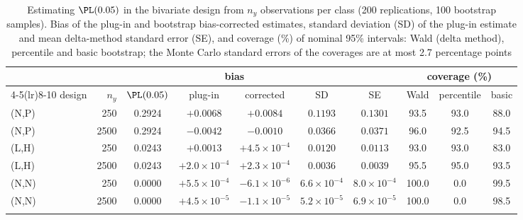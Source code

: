 \begin{table}[t]
\caption{Estimating $\PL(0.05)$ in the bivariate design from $n_y$ observations per class (200 replications, 100 bootstrap samples). Bias of the plug-in and bootstrap bias-corrected estimates, standard deviation (SD) of the plug-in estimate and mean delta-method standard error (SE), and coverage (\%) of nominal 95\% intervals: Wald (delta method), percentile and basic bootstrap; the Monte Carlo standard errors of the coverages are at most 2.7 percentage points}\label{tab:inference}
\footnotesize\setlength{\tabcolsep}{3pt}
\begin{tabular*}{\textwidth}{@{\extracolsep\fill}lrcccccccc@{}}
\toprule
 & & & \multicolumn{2}{c}{bias} & & & \multicolumn{3}{c}{coverage (\%)}\\
\cmidrule(lr){4-5}\cmidrule(lr){8-10}
design & $n_y$ & $\PL(0.05)$ & plug-in & corrected & SD & SE & Wald & percentile & basic\\
\midrule
(N,P) & 250 & 0.2924 & $+0.0068$ & $+0.0084$ & $0.1193$ & $0.1301$ & 93.5 & 93.0 & 88.0 \\
(N,P) & 2500 & 0.2924 & $-0.0042$ & $-0.0010$ & $0.0366$ & $0.0371$ & 96.0 & 92.5 & 94.5 \\
(L,H) & 250 & 0.0243 & $+0.0013$ & $+4.5\times10^{-4}$ & $0.0120$ & $0.0113$ & 93.0 & 93.0 & 83.0 \\
(L,H) & 2500 & 0.0243 & $+2.0\times10^{-4}$ & $+2.3\times10^{-4}$ & $0.0036$ & $0.0039$ & 95.5 & 95.0 & 93.5 \\
(N,N) & 250 & 0.0000 & $+5.5\times10^{-4}$ & $-6.1\times10^{-6}$ & $6.6\times10^{-4}$ & $8.0\times10^{-4}$ & 100.0 & 0.0 & 99.5 \\
(N,N) & 2500 & 0.0000 & $+4.5\times10^{-5}$ & $-1.1\times10^{-5}$ & $5.2\times10^{-5}$ & $6.9\times10^{-5}$ & 100.0 & 0.0 & 98.5 \\
\botrule
\end{tabular*}
\end{table}
